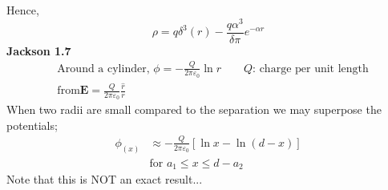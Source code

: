 \documentclass[letterpage]{article}
\begin{document}
Hence,
\begin{equation*}
  \rho = q \delta^3 (r) - \frac{q\alpha^3}{\delta\pi} e^{-\alpha r}
\end{equation*}
\textbf{Jackson 1.7}
\begin{align*}
  &\text{Around a cylinder, } \phi = - \frac{Q}{2\pi \varepsilon_0} \ln r 
  \qquad Q \text{: charge per unit length}\\
  &\text{from} \textbf{E} = \frac{Q}{2\pi \varepsilon_0} \frac{\hat{r}}{r}
\end{align*}
When two radii are small compared to the separation we may superpose
the potentials;
\begin{align*}
  \phi_{(x)} &\approx -\frac{Q}{2\pi \varepsilon_0} 
  \left[\ln x- \ln(d-x)\right]\\
  &\text{for } a_1 \leq x \leq d-a_2  
\end{align*}
Note that this is NOT an exact result...
\end{document}
